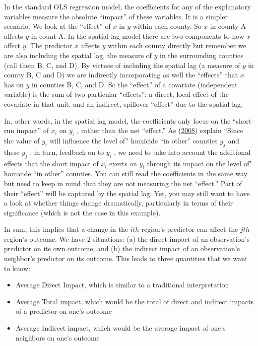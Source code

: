 \documentclass[
  krantz2]{krantz}
\providecommand{\tightlist}{%
  \setlength{\itemsep}{0pt}\setlength{\parskip}{0pt}}
\begin{document}
In the standard OLS regression model, the coefficients for any of the explanatory variables measure the absolute ``impact'' of these variables. It is a simpler scenario. We look at the ``effect'' of \(x\) in \(y\) within each county. So \(x\) in county A affects \(y\) in count A. In the spatial lag model there are two components to how \(x\) affect \(y\). The predictor \(x\) affects \(y\) within each county directly but remember we are also including the spatial lag, the measure of \(y\) in the surrounding counties (call them B, C, and D). By virtues of including the spatial lag (a measure of \(y\) in county B, C and D) we are indirectly incorporating as well the ``effects'' that \(x\) has on \(y\) in counties B, C, and D. So the ``effect'' of a covariate (independent variable) is the sum of two particular ``effects'': a direct, local effect of the covariate in that unit, and an indirect, spillover ``effect'' due to the spatial lag.

In, other words, in the spatial lag model, the coefficients only focus on the ``short-run impact'' of \(x_i\) on \(y_i\) , rather than the net ``effect.'' As (\protect\hyperlink{ref-Ward_2008}{2008}) explain ``Since the value of \(y_i\) will influence the level of'' homicide ``in other'' counties \(y_j\) and these \(y_j\) , in turn, feedback on to \(y_i\) , we need to take into account the additional effects that the short impact of \(x_i\) exerts on \(y_i\) through its impact on the level of" homicide ``in other'' counties. You can still read the coefficients in the same way but need to keep in mind that they are not measuring the net ``effect.'' Part of their ``effect'' will be captured by the spatial lag. Yet, you may still want to have a look at whether things change dramatically, particularly in terms of their significance (which is not the case in this example).

In sum, this implies that a change in the \(ith\) region's predictor can affect the \(jth\) region's outcome. We have 2 situations: (a) the direct impact of an observation's predictor on its own outcome, and (b) the indirect impact of an observation's neighbor's predictor on its outcome. This leads to three quantities that we want to know:

\begin{itemize}
\tightlist
\item
  Average Direct Impact, which is similar to a traditional interpretation
\item
  Average Total impact, which would be the total of direct and indirect impacts of a predictor on one's outcome
\item
  Average Indirect impact, which would be the average impact of one's neighbors on one's outcome
\end{itemize}
\end{document}
